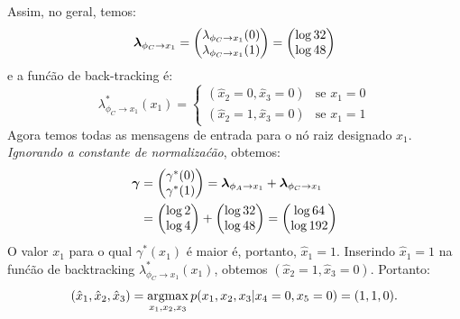 \begin{exenumerate}
\begin{solution}
        Assim, no geral, temos:
        \begin{equation}
            \boldsymbol{\lambda}_{\phi_C \to x_1} = \begin{pmatrix}
                \lambda_{\phi_C \to x_1}(0)\\
                \lambda_{\phi_C \to x_1}(1)
            \end{pmatrix}
            = \begin{pmatrix}
                \log 32\\
                \log 48
            \end{pmatrix}
        \end{equation}
        e a fun\'c\~ao de back-tracking \'e:
        \begin{equation}
            \lambda^*_{\phi_C \to x_1}(x_1) = \begin{cases}
                (\hat{x}_2 = 0, \hat{x}_3 = 0) & \text{se } x_1=0\\
                (\hat{x}_2=1, \hat{x}_3=0) & \text{se } x_1=1
            \end{cases}
        \end{equation}
        Agora temos todas as mensagens de entrada para o n\'o raiz designado $x_1$. \emph{Ignorando a constante de normaliza\'c\~ao}, obtemos:
        \begin{align}
            \boldsymbol{\gamma}&=\begin{pmatrix}
                \gamma^*(0) \\
                \gamma^*(1)
            \end{pmatrix}
            =  \boldsymbol{\lambda}_{\phi_A \to x_1} +  \boldsymbol{\lambda}_{\phi_C \to x_1}\\
            &=  \begin{pmatrix}
                \log 2\\
                \log 4
            \end{pmatrix} +
            \begin{pmatrix}
                \log 32\\
                \log 48
            \end{pmatrix}
            =
            \begin{pmatrix}
                \log 64\\
                \log 192
            \end{pmatrix}
        \end{align}
        O valor $x_1$ para o qual $\gamma^*(x_1)$ \'e maior \'e, portanto,
        $\hat{x}_1 = 1$. Inserindo $\hat{x}_1 = 1$ na fun\'c\~ao de backtracking
        $\lambda^*_{\phi_C \to x_1}(x_1)$, obtemos $(\hat{x}_2=1, \hat{x}_3=0)$. Portanto:
        \begin{equation}
            (\hat{x}_1, \hat{x}_2, \hat{x}_3) = \operatorname*{\mathrm{argmax}}_{x_1, x_2, x_3} p(x_1, x_2, x_3 | x_4=0, x_5=0) = (1,1,0).
        \end{equation}
        

\end{solution}
\end{exenumerate}

